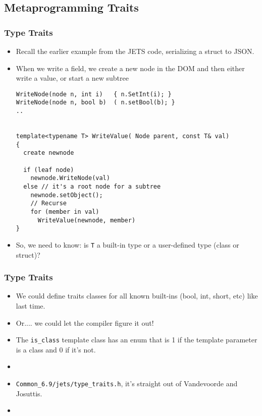 \subsection{Metaprogramming Traits}
\begin{frame}[fragile,t]
\frametitle{Type Traits}
\begin{itemize}[<+->]
\item Recall the earlier example from the JETS code, serializing a
  struct to JSON.
\item When we write a field, we create a new node in the DOM and then
  either write a value, or start a new subtree 
{\scriptsize\begin{verbatim}
WriteNode(node n, int i)   { n.SetInt(i); }
WriteNode(node n, bool b)  ( n.setBool(b); }
..


template<typename T> WriteValue( Node parent, const T& val)
{
  create newnode

  if (leaf node)
    newnode.WriteNode(val)
  else // it's a root node for a subtree
    newnode.setObject();
    // Recurse
    for (member in val)
      WriteValue(newnode, member)
}
\end{verbatim}
} 
\item So, we need to know: is \texttt{T} a built-in type or a
  user-defined type (class or struct)?
\end{itemize}

\end{frame}


\begin{frame}[fragile,t]
\frametitle{Type Traits}
\begin{itemize}[<+->]
\item We could define traits classes for all known built-ins (bool,
  int, short, etc) like last time.

\item Or.... we could let the compiler figure it out!

\vskip 12pt

\item The \texttt{is\_class} template class has an enum that is 1 if
  the template parameter is a class and 0 if it's not.
\item {}
\item \texttt{Common\_6.9/jets/type\_traits.h}, it's straight out of
  Vandevoorde and Josuttis.
\vskip 12pt
\item {}
\end{itemize}


\end{frame}


